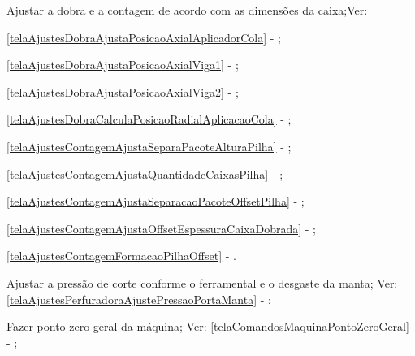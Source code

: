 \begin{procedureAdjustmentNoRecipe}
  \item[\ding{\dingNumber}] Ajustar a dobra e a contagem de acordo com as dimensões da caixa;Ver: 
  \begin{foldCount}
    \item[\ding{\dingNumber}] \ref{telaAjustesDobraAjustaPosicaoAxialAplicadorCola} - ;
    \item[\ding{\dingNumber}] \ref{telaAjustesDobraAjustaPosicaoAxialViga1} - ;
    \item[\ding{\dingNumber}] \ref{telaAjustesDobraAjustaPosicaoAxialViga2} - ;
    \item[\ding{\dingNumber}] \ref{telaAjustesDobraCalculaPosicaoRadialAplicacaoCola} - ;
    \item[\ding{\dingNumber}] \ref{telaAjustesContagemAjustaSeparaPacoteAlturaPilha} - ;
    \item[\ding{\dingNumber}] \ref{telaAjustesContagemAjustaQuantidadeCaixasPilha} - ;
    \item[\ding{\dingNumber}] \ref{telaAjustesContagemAjustaSeparacaoPacoteOffsetPilha} - ;
    \item[\ding{\dingNumber}] \ref{telaAjustesContagemAjustaOffsetEspessuraCaixaDobrada} - ;
    \item[\ding{\dingNumber}] \ref{telaAjustesContagemFormacaoPilhaOffset} - .
  \end{foldCount}
  \item[\ding{\dingNumber}] Ajustar a pressão de corte conforme o ferramental e o desgaste da manta; Ver: \ref{telaAjustesPerfuradoraAjustePressaoPortaManta} - ;
  \item[\ding{\dingNumber}] Fazer ponto zero geral da máquina; Ver: \ref{telaComandosMaquinaPontoZeroGeral} - ;

\end{procedureAdjustmentNoRecipe}
